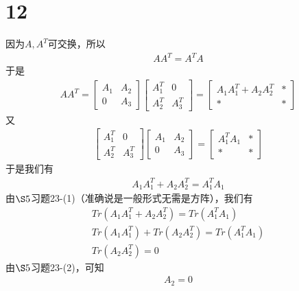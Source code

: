 \documentclass{article}
\begin{document}
\section*{12}
因为$A, A^T$可交换，所以
\begin{align*}
  A A^T = A^T A
\end{align*}
于是
\begin{align*}
  A A^T =
  \begin{bmatrix}
    A_1 & A_2 \\
    0   & A_3
  \end{bmatrix}
  \begin{bmatrix}
    A_1^T & 0     \\
    A_2^T & A_3^T
  \end{bmatrix}
  =
  \begin{bmatrix}
    A_1 A_1^T + A_2 A_2^T & * \\
    *                     & *
  \end{bmatrix}
\end{align*}
又
\begin{align*}
  \begin{bmatrix}
    A_1^T & 0     \\
    A_2^T & A_3^T
  \end{bmatrix}
  \begin{bmatrix}
    A_1 & A_2 \\
    0   & A_3
  \end{bmatrix}
  =
  \begin{bmatrix}
    A_1^T A_1 & * \\
    *         & *
  \end{bmatrix}
\end{align*}
于是我们有
\begin{align*}
  A_1 A_1^T + A_2 A_2^T = A_1^T A_1
\end{align*}
由$\S 5$习题23-(1)（准确说是一般形式无需是方阵），我们有
\begin{align*}
  Tr(A_1 A_1^T + A_2 A_2^T) = Tr(A_1^T A_1)     \\
  Tr(A_1 A_1^T) + Tr(A_2 A_2^T) = Tr(A_1^T A_1) \\
  Tr(A_2 A_2^T) = 0
\end{align*}
由$\S 5$习题23-(2)，可知
\begin{align*}
  A_2 = 0
\end{align*}
\end{document}

